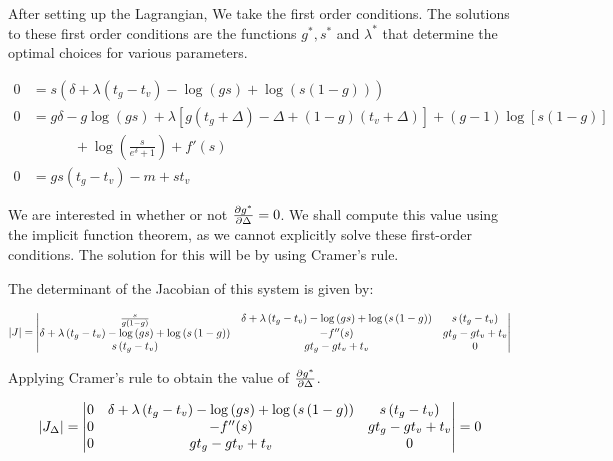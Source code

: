 \documentclass[12pt]{paper}
\begin{document}
After setting up the Lagrangian, We take the first order
conditions. The solutions to these first order conditions are the
functions $g^{*}, s^{*}$ and $\lambda^{*}$ that determine the optimal
choices for various parameters.

\begin{align*}
  0 &= s \left ( \delta + \lambda \left(t_{g} - t_{v}\right) - \log{\left (g s \right
  )} + \log{\left ( s \left(1-g\right) \right )}\right)\\
  0 &= g \delta - g \log{\left (g s \right )} + \lambda \left[ g \left(t_{g} +
  \Delta\right) - \Delta + \left(1-g\right) \left(t_{v} + \Delta\right)\right] +
      \left(g - 1\right) \log{\left [s \left(1-g\right) \right ]}\\
  & \quad \quad \quad + \log{\left (\frac{s}{e^{\delta} + 1} \right )} + f'\left (s \right )\\
  0 &= g s \left( t_g - t_v \right) - m + s t_{v}
\end{align*}

We are interested in whether or not $\frac{ \partial g^{*}}{ \partial \Delta} = 0$. We shall
compute this value using the implicit function theorem, as we cannot
explicitly solve these first-order conditions. The solution for this
will be by using Cramer's rule.


The determinant of the Jacobian of this system is given by:

$$\abs{J} = \begin{vmatrix}
  \frac{s}{g \left( 1- g\right)} &
  \delta + \lambda \left(t_{g} - t_{v}\right) - \log{\left (g s \right )} + \log{\left ( s \left(1-g\right) \right )} &
  s \left(t_{g} - t_{v}\right)\\
  
  \delta + \lambda \left(t_{g} - t_{v}\right) - \log{\left (g s \right )} + \log{\left ( s \left(1-g\right) \right )} &
  - f''{\left (s \right )} &
  g t_{g} - g t_{v} + t_{v}\\
  
  s \left(t_{g} - t_{v}\right) &
  g t_{g} - g t_{v} + t_{v} &
  0
\end{vmatrix}$$

Applying Cramer's rule to obtain the value of $\frac{ \partial g^{*}}{ \partial \Delta}$.


$$\left \lvert J_{\Delta} \right \rvert = \begin{vmatrix}
  0 &  \delta + \lambda \left(t_{g} - t_{v}\right) - \log{\left (g s \right )} + \log{\left ( s \left(1-g\right) \right )} &  s \left(t_{g} - t_{v}\right)\\
  0 &  - f''{\left (s \right )} &  g t_{g} - g t_{v} + t_{v}\\  
  0 &  g t_{g} - g t_{v} + t_{v}&  0
\end{vmatrix} = 0$$
\end{document}
